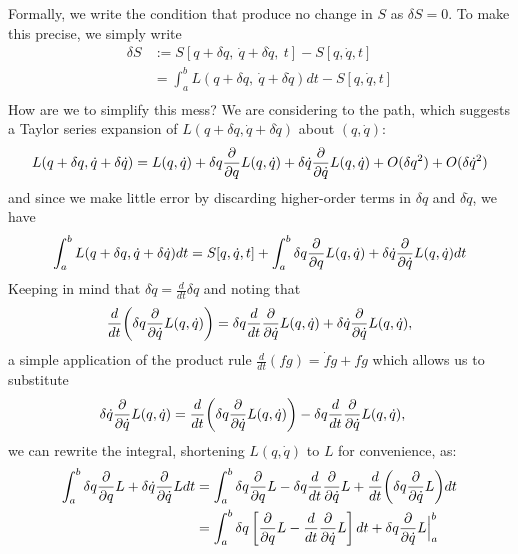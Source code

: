 \documentclass[12pt]{article}
\newcommand{\md}{d}
\newcommand{\mderiv}[1]{\frac{\md}{\md {#1}}} %
\newcommand{\defined}{:=}
\newcommand{\mvar}{t}
\begin{document}
Formally, we write the condition that  produce no change in $S$ as $\delta S = 0$.  To make this precise, we simply write
\begin{align*}
\delta S 
&\defined S[q + \delta q,\ \dot{q} + \delta \dot{q},\ \mvar] - S[q, \dot{q},\mvar] \\
&= \int_{a}^{b} L(q + \delta q,\ \dot{q} + \delta \dot{q}) \md \mvar - S[q, \dot{q},\mvar] \\
\end{align*}
How are we to simplify this mess?  We are considering  to the path, which suggests a Taylor series expansion of $L(q + \delta q,\dot{q} + \delta \dot{q})$ about $(q, \dot{q})$:
\begin{equation*}
L(q + \delta q,\dot{q} + \delta \dot{q}) = L(q,\dot{q}) + \delta q \frac{\partial}{\partial {q}}L(q,\dot{q}) + \delta \dot{q} \frac{\partial}{\partial {\dot{q}}}L(q,\dot{q}) + O(\delta q^2) + O(\delta \dot{q}^2)
\end{equation*}
and since we make little error by discarding higher-order terms in $\delta q$ and $\delta \dot{q}$, we have
\begin{equation*}
\int_{a}^{b} L(q + \delta q,\dot{q} + \delta \dot{q}) \md \mvar 
= S[q, \dot{q}, \mvar] + \int_{a}^{b} \delta q \mpderiv{q}L(q,\dot{q}) + \delta \dot{q} \mpderiv{\dot{q}}L(q,\dot{q}) \md \mvar
\end{equation*}
Keeping in mind that $\delta \dot{q} = \mderiv{\mvar}{\delta q}$ and noting that
\begin{align*}
\mderiv{\mvar}{\left(\delta q \mpderiv{\dot{q}}L(q,\dot{q})\right)} &= \delta q \mderiv{\mvar}{\mpderiv{\dot{q}}L(q,\dot{q})} + \delta \dot{q} \mpderiv{\dot{q}}L(q,\dot{q}),\\
\end{align*}
a simple application of the product rule $\mderiv{\mvar}{(fg)} = \dot{f}g + f\dot{g}$ which allows us to substitute
\begin{align*}
\delta \dot{q} \mpderiv{\dot{q}}L(q,\dot{q}) &= \mderiv{\mvar}{\left(\delta q \mpderiv{\dot{q}}L(q,\dot{q})\right)} - \delta q \mderiv{\mvar}{\mpderiv{\dot{q}}L(q,\dot{q})},
\end{align*}
we can rewrite the integral, shortening $L(q,\dot{q})$ to $L$ for convenience, as:
\begin{align*}
\int_{a}^{b} \delta q \mpderiv{q} L + \delta \dot{q} \mpderiv{\dot{q}} L \md \mvar
&= \int_{a}^{b} \delta q \mpderiv{q} L - \delta q \mderiv{\mvar}{\mpderiv{\dot{q}} L} + \mderiv{\mvar}{\left(\delta q \mpderiv{\dot{q}} L \right)} \md \mvar\\
&= \int_{a}^{b} \delta q \left[ \mpderiv{q} L - \mderiv{\mvar}{\mpderiv{\dot{q}} L}\right] \md \mvar + \delta q \mpderiv{\dot{q}} L \Big|_{a}^{b}\\
\end{align*}
\end{document}
